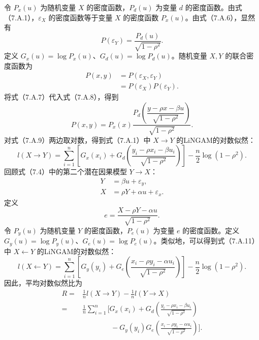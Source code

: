 令 $P_x(u)$ 为随机变量 $X$ 的密度函数，$P_d(u)$ 为变量 $d$ 的密度函数。由式（7.A.1），$\varepsilon_X$ 的密度函数等于变量 $X$ 的密度函数 $P_x(u)$。由式（7.A.6），显然有
\begin{equation}
P(\varepsilon_Y)=\frac{P_d(u)}{\sqrt{1-\rho^2}}.\tag{7.A.7}
\end{equation}
定义 $G_x(u)=\log P_x(u)$、$G_d(u)=\log P_d(u)$。随机变量 $X,Y$ 的联合密度函数为
\begin{equation}
\begin{aligned}
P(x,y)&=P(\varepsilon_X,\varepsilon_Y)\\
 &=P(\varepsilon_X)P(\varepsilon_Y).
\end{aligned}\tag{7.A.8}
\end{equation}
将式（7.A.7）代入式（7.A.8），得到
\begin{equation}
P(x,y)=P_x(x)\frac{P_d\left(\dfrac{y-\rho x-\beta u}{\sqrt{1-\rho^2}}\right)}
 {\sqrt{1-\rho^2}}.\tag{7.A.9}
\end{equation}
对式（7.A.9）两边取对数，得到式（7.A.1）中 $X\to Y$ 的LiNGAM的对数似然：
\begin{equation}
l(X\to Y)=\sum_{i=1}^n\left[G_x(x_i)+G_d\left(
 \frac{y_i-\rho x_i-\beta u_i}{\sqrt{1-\rho^2}}\right)\right]
 -\frac n2\log(1-\rho^2).\tag{7.A.10}
\end{equation}
回顾式（7.4）中的第二个潜在因果模型 $Y\to X$：
\begin{equation}
\begin{aligned}
Y&=\beta u+\varepsilon_y,\\
X&=\rho Y+\alpha u+\varepsilon_x.
\end{aligned}\tag{7.A.11}
\end{equation}
定义
\[
e=\frac{X-\rho Y-\alpha u}{\sqrt{1-\rho^2}}.
\]
令 $P_y(u)$ 为随机变量 $Y$ 的密度函数，$P_e(u)$ 为变量 $e$ 的密度函数。定义 $G_y(u)=\log P_y(u)$、$G_e(u)=\log P_e(u)$。类似地，可以得到式（7.A.11）中 $X\leftarrow Y$ 的LiNGAM的对数似然：
\begin{equation}
l(X\leftarrow Y)=\sum_{i=1}^n\left[G_y(y_i)+G_e\left(
 \frac{x_i-\rho y_i-\alpha u_i}{\sqrt{1-\rho^2}}\right)\right]
 -\frac n2\log(1-\rho^2).\tag{7.A.12}
\end{equation}
因此，平均对数似然比为
\begin{equation}
\begin{aligned}
R={}&\frac1n l(X\to Y)-\frac1n l(Y\to X)\\
={}&\frac1n\sum_{i=1}^n\biggl[G_x(x_i)+G_d\left(
 \frac{y_i-\rho x_i-\beta u_i}{\sqrt{1-\rho^2}}\right)\\
&\hspace{4em}{}-G_y(y_i)G_e\left(
 \frac{x_i-\rho y_i-\alpha u_i}{\sqrt{1-\rho^2}}\right)\biggr].
\end{aligned}\tag{7.A.13}
\end{equation}
